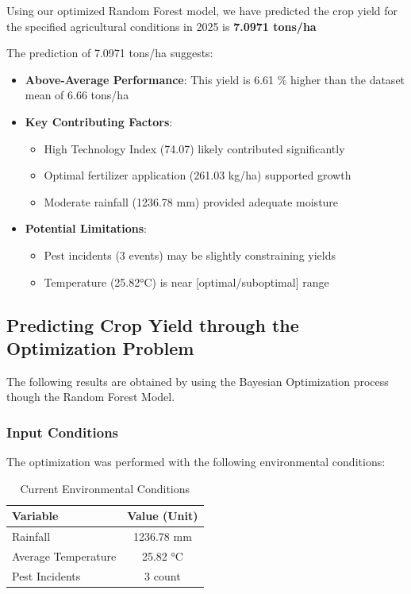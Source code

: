 Using our optimized Random Forest model, we have predicted the crop yield for the specified agricultural conditions in 2025 is \textbf{7.0971 tons/ha}


The prediction of 7.0971 tons/ha suggests:

\begin{itemize}
\item \textbf{Above-Average Performance}: This yield is 6.61 $\%$ higher than the dataset mean of 6.66 tons/ha
\item \textbf{Key Contributing Factors}:
  \begin{itemize}
  \item High Technology Index (74.07) likely contributed significantly
  \item Optimal fertilizer application (261.03 kg/ha) supported growth
  \item Moderate rainfall (1236.78 mm) provided adequate moisture
  \end{itemize}
\item \textbf{Potential Limitations}:
  \begin{itemize}
  \item Pest incidents (3 events) may be slightly constraining yields
  \item Temperature (25.82°C) is near [optimal/suboptimal] range
  \end{itemize}
\end{itemize}

\subsection{Predicting Crop Yield through the Optimization Problem}

The following results are obtained by using the Bayesian Optimization process though the Random Forest Model.

\subsubsection{Input Conditions}
The optimization was performed with the following environmental conditions:

\begin{table}[H]
\centering
\caption{Current Environmental Conditions}
\label{tab:conditions}
\begin{tabular}{@{}lc@{}}
\toprule
\textbf{Variable} & \textbf{Value (Unit)} \\
\midrule
Rainfall & 1236.78 mm \\
Average Temperature & 25.82 \si{\degreeCelsius} \\
Pest Incidents & 3 count \\
\bottomrule
\end{tabular}
\end{table}

